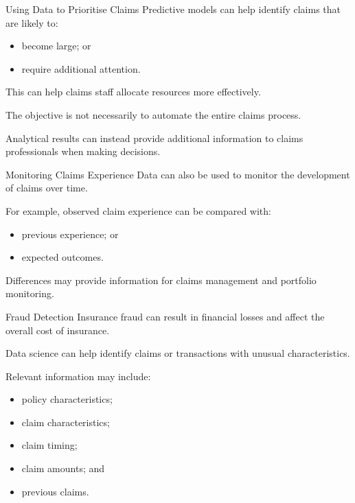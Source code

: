 \documentclass[
  ignorenonframetext,
  aspectratio=169,
]{beamer}
\providecommand{\tightlist}{%
  \setlength{\itemsep}{0pt}\setlength{\parskip}{0pt}}
\begin{document}
\begin{frame}{Using Data to Prioritise Claims}
\protect{}\label{using-data-to-prioritise-claims}
Predictive models can help identify claims that are likely to:

\begin{itemize}
\tightlist
\item
  become large; or
\item
  require additional attention.
\end{itemize}

This can help claims staff allocate resources more effectively.

The objective is not necessarily to automate the entire claims process.

Analytical results can instead provide additional information to claims
professionals when making decisions.
\end{frame}

\begin{frame}{Monitoring Claims Experience}
\protect{}\label{monitoring-claims-experience}
Data can also be used to monitor the development of claims over time.

For example, observed claim experience can be compared with:

\begin{itemize}
\tightlist
\item
  previous experience; or
\item
  expected outcomes.
\end{itemize}

Differences may provide information for claims management and portfolio
monitoring.
\end{frame}

\begin{frame}{Fraud Detection}
\protect{}\label{fraud-detection}
Insurance fraud can result in financial losses and affect the overall
cost of insurance.

Data science can help identify claims or transactions with unusual
characteristics.

Relevant information may include:

\begin{itemize}
\tightlist
\item
  policy characteristics;
\item
  claim characteristics;
\item
  claim timing;
\item
  claim amounts; and
\item
  previous claims.
\end{itemize}
\end{frame}
\end{document}
